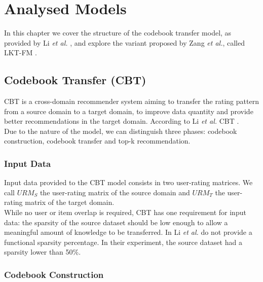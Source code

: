 \chapter{Analysed Models}
\label{ch:analysed-models}

In this chapter we cover the structure of the codebook transfer model, as provided by Li \textit{et al.} \cite{10.5555/1661445.1661773}, and explore the variant proposed by Zang \textit{et al.}, called LKT-FM \cite{10.1007/978-3-319-71246-8_39}.


\section{Codebook Transfer (CBT)}

CBT is a cross-domain recommender system aiming to transfer the rating pattern from a source domain to a target domain, to improve data quantity and provide better recommendations in the target domain. According to Li \textit{et al.} \cite{10.5555/1661445.1661773} CBT .\\
Due to the nature of the model, we can distinguish three phases: codebook construction, codebook transfer and top-k recommendation.


\subsection{Input Data}

Input data provided to the CBT model consists in two user-rating matrices. We call $URM_S$ the user-rating matrix of the source domain and $URM_T$ the user-rating matrix of the target domain.\\
While no user or item overlap is required, CBT has one requirement for input data: the sparsity of the source dataset should be low enough to allow a meaningful amount of knowledge to be transferred. In \cite{10.5555/1661445.1661773} Li \textit{et al.} do not provide a functional sparsity percentage. In their experiment, the source dataset had a sparsity lower than 50\%.


\subsection{Codebook Construction}

